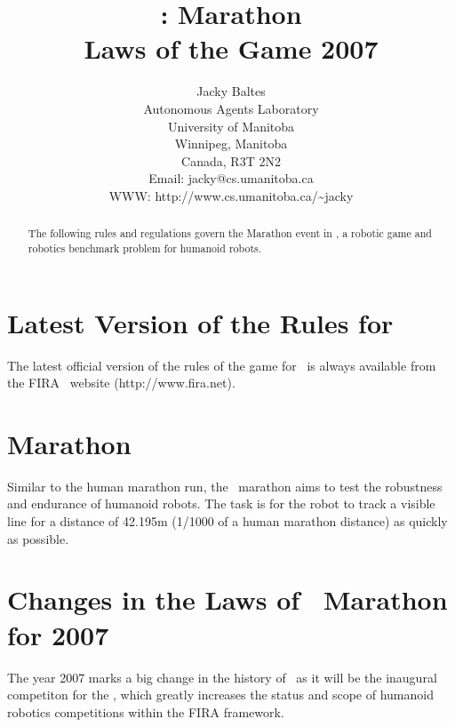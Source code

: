 \documentclass[12pt]{hurocup}
\begin{document}
\title{\HuroCup: Marathon\\
  Laws of the Game 2007}


\author{Jacky Baltes\\
Autonomous Agents Laboratory\\
University of Manitoba\\
Winnipeg, Manitoba\\
Canada, R3T 2N2\\
Email: jacky@cs.umanitoba.ca\\
WWW: http://www.cs.umanitoba.ca/\~{ }jacky
}

\maketitle
\begin{abstract}
The following rules and regulations govern the Marathon event in
\HuroCup, a robotic game and robotics benchmark problem for humanoid
robots.
%
\end{abstract}

\section*{Latest Version of the Rules for \HuroCup}
\label{sec:updates}

The latest official version of the rules of the game for \HuroCup\ is
always available from the FIRA \HuroCup\ website (http://www.fira.net).

\newpage

\section{Marathon}
\label{sec:marathon} 

Similar to the human marathon run, the \HuroCup\ marathon aims to test
the robustness and endurance of humanoid robots. The task is for the
robot to track a visible line for a distance of 42.195m (1/1000 of a
human marathon distance) as quickly as possible. 

\section{Changes in the Laws of \HuroCup\ Marathon for 2007}

The year 2007 marks a big change in the history of \HuroCup\ as it will
be the inaugural competiton for the \HuroCup, which greatly increases
the status and scope of humanoid robotics competitions within the FIRA
framework.
\end{document}
